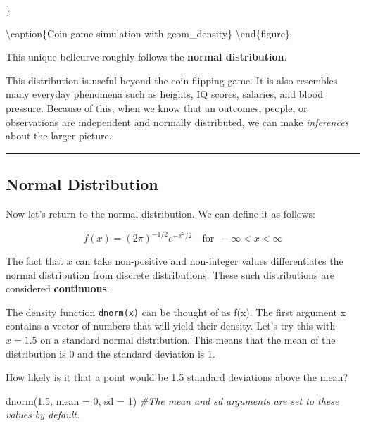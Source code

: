 \documentclass[
]{article}
\newenvironment{Shaded}{\begin{snugshade}}{\end{snugshade}}
\newcommand{\AttributeTok}[1]{\textcolor[rgb]{0.77,0.63,0.00}{#1}}
\newcommand{\CommentTok}[1]{\textcolor[rgb]{0.56,0.35,0.01}{\textit{#1}}}
\newcommand{\DecValTok}[1]{\textcolor[rgb]{0.00,0.00,0.81}{#1}}
\newcommand{\FloatTok}[1]{\textcolor[rgb]{0.00,0.00,0.81}{#1}}
\newcommand{\FunctionTok}[1]{\textcolor[rgb]{0.00,0.00,0.00}{#1}}
\newcommand{\NormalTok}[1]{#1}
\begin{document}
\}

\textbackslash caption\{Coin game simulation with geom\_density\}\label{fig:coinplot-density}
\textbackslash end\{figure\}

This unique bellcurve roughly follows the \textbf{normal distribution}.

This distribution is useful beyond the coin flipping game. It is also resembles many everyday phenomena such as heights, IQ scores, salaries, and blood pressure. Because of this, when we know that an outcomes, people, or observations are independent and normally distributed, we can make \emph{inferences} about the larger picture.

\begin{center}\rule{0.5\linewidth}{0.5pt}\end{center}

\hypertarget{normal-distribution}{%
\subsection{Normal Distribution}\label{normal-distribution}}

Now let's return to the normal distribution. We can define it as follows:

\[f(x)=(2\pi)^{-1/2}e^{-x^2/2} \quad \textrm{for} \enspace -\infty < x < \infty\]

The fact that \(x\) can take non-positive and non-integer values differentiates the normal distribution from \protect\hyperlink{Discrete}{discrete distributions}. These such distributions are considered \textbf{continuous}.

The density function \texttt{dnorm(x)} can be thought of as f(x). The first argument x contains a vector of numbers that will yield their density. Let's try this with \(x = 1.5\) on a standard normal distribution. This means that the mean of the distribution is 0 and the standard deviation is 1.

How likely is it that a point would be 1.5 standard deviations above the mean?

\begin{Shaded}
\begin{Highlighting}[]
\FunctionTok{dnorm}\NormalTok{(}\FloatTok{1.5}\NormalTok{, }\AttributeTok{mean =} \DecValTok{0}\NormalTok{, }\AttributeTok{sd =} \DecValTok{1}\NormalTok{) }\CommentTok{\#The mean and sd arguments are set to these values by default.}
\end{Highlighting}
\end{Shaded}
\end{document}
